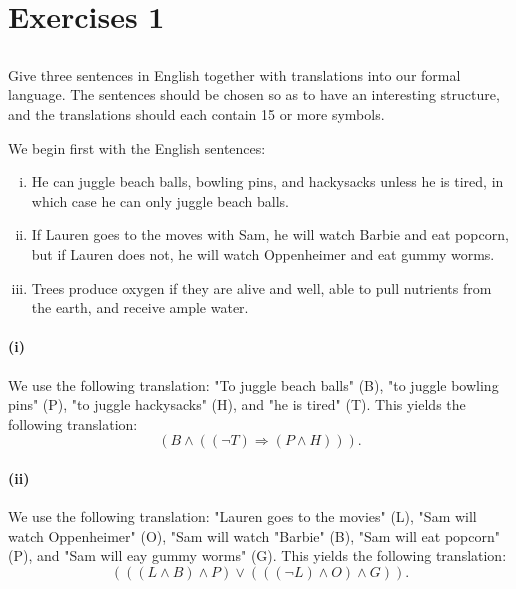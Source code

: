 \documentclass{report}
\begin{document}
\section{Exercises 1}%

\subsection{}%

  Give three sentences in English together with translations into our formal
    language.
  The sentences should be chosen so as to have an interesting structure, and the
    translations should each contain 15 or more symbols.

  \begin{answer}

    We begin first with the English sentences:
      \begin{enumerate}[(i)]
        \item He can juggle beach balls, bowling pins, and hackysacks unless
          he is tired, in which case he can only juggle beach balls.
        \item
          If Lauren goes to the moves with Sam, he will watch Barbie and
            eat popcorn, but if Lauren does not, he will watch Oppenheimer and
            eat gummy worms.
        \item
          Trees produce oxygen if they are alive and well, able to pull
            nutrients from the earth, and receive ample water.
      \end{enumerate}

    \paragraph{(i)}%

      We use the following translation: "To juggle beach balls" (B),
        "to juggle bowling pins" (P), "to juggle hackysacks" (H), and
        "he is tired" (T).
      This yields the following translation:
        $$(B \land ((\neg T) \Rightarrow (P \land H))).$$

    \paragraph{(ii)}%

      We use the following translation: "Lauren goes to the movies" (L),
        "Sam will watch Oppenheimer" (O), "Sam will watch "Barbie" (B),
        "Sam will eat popcorn" (P), and "Sam will eay gummy worms" (G).
      This yields the following translation:
        $$(((L \land B) \land P) \lor (((\neg L) \land O) \land G)).$$


\end{answer}
\end{document}
